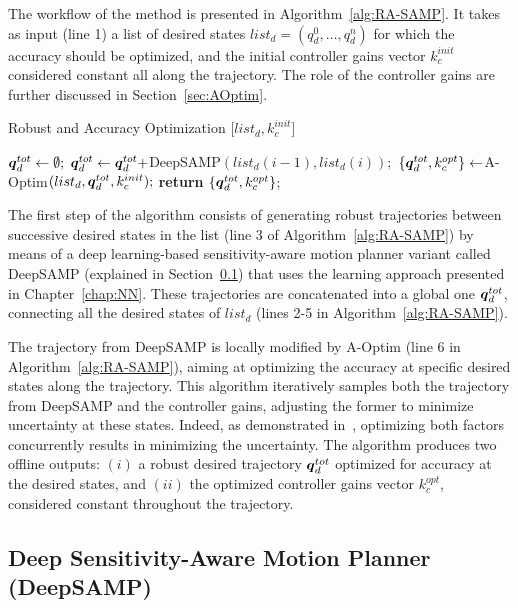 The workflow of the method is presented in Algorithm~\ref{alg:RA-SAMP}. 
It takes as input (line 1) a list of desired states $list_{d} = (q_{d}^0, \dots, q_{d}^n)$ for which the accuracy should be optimized, and the initial controller gains vector $k_{c}^{init}$ considered constant all along the trajectory.
The role of the controller gains are further discussed in Section~\ref{sec:AOptim}.

\begin{algorithm}[h]
\caption{Robust and Accuracy Optimization [$list_{d}, k_{c}^{init}$]}\label{alg:RA-SAMP}
\begin{algorithmic}[1]
\State $\boldsymbol{q}_d^{tot} \gets \emptyset;$
    \State $\boldsymbol{q}_d^{tot} \gets \boldsymbol{q}_d^{tot} + $DeepSAMP$(list_{d}(i-1),list_{d}(i));$
\EndFor
\State $\left \{ \boldsymbol{q}_d^{tot}, k_{c}^{opt} \right \} \gets $A-Optim$(list_{d},\boldsymbol{q}_d^{tot}, k_{c}^{init});$
\State \textbf{return} $\left \{ \boldsymbol{q}_d^{tot}, k_{c}^{opt}  \right \}$;
\end{algorithmic}
\end{algorithm}

The first step of the algorithm consists of generating robust trajectories between successive desired states in the list (line 3 of Algorithm~\ref{alg:RA-SAMP}) by means of a deep learning-based sensitivity-aware motion planner variant called DeepSAMP (explained in Section~\ref{sec:RSAMP}) that uses the learning approach presented in Chapter~\ref{chap:NN}.
These trajectories are concatenated into a global one $\boldsymbol{q}_d^{tot}$, connecting all the desired states of $list_{d}$ (lines 2-5 in Algorithm~\ref{alg:RA-SAMP}). 

The trajectory from DeepSAMP is locally modified by A-Optim (line 6 in Algorithm~\ref{alg:RA-SAMP}), aiming at optimizing the accuracy at specific desired states along the trajectory. 
This algorithm iteratively samples both the trajectory from DeepSAMP and the controller gains, adjusting the former to minimize uncertainty at these states. 
Indeed, as demonstrated in~\cite{AliIROS}, optimizing both factors concurrently results in minimizing the uncertainty.
The algorithm produces two offline outputs: $(i)$ a robust desired trajectory $\boldsymbol{q}_d^{tot}$ optimized for accuracy at the desired states, and $(ii)$ the optimized controller gains vector $k_{c}^{opt}$, considered constant throughout the trajectory.

\subsection{Deep Sensitivity-Aware Motion Planner (DeepSAMP)}\label{sec:RSAMP}

